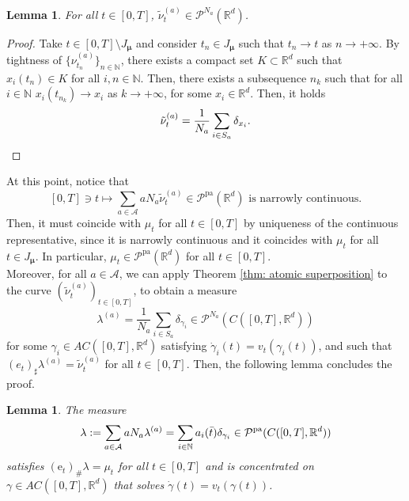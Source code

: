 \documentclass[10pt,leqno]{amsart}
\numberwithin{equation}{section}
\newtheorem{lemma}[teorema]{Lemma}
\newcommand{\R}{\mathbb{R}}
\newcommand{\N}{\mathbb{N}}
\newcommand{\PP}{\mathcal{P}}
\newcommand{\PPpa}{\PP^{\operatorname{pa}}}
\newcommand{\e}{\mathrm{e}}
\begin{document}
\begin{lemma}\label{lemma: nu_t^a}
    For all $t\in [0,T]$, $\tilde{\nu}_t^{(a)} \in \PP^{N_a}(\R^d)$. 
\end{lemma}
\begin{proof}
    Take $t\in[0,T]\setminus J_{\boldsymbol{\mu}}$ and consider $t_n \in J_{\boldsymbol{\mu}}$ such that $t_n \to t$ as $n\to +\infty$. By tightness of $\{\nu_{t_n}^{(a)}\}_{n\in \N}$, there exists a compact set $K\subset \R^d$ such that $x_i(t_n)\in K$ for all $i,n\in \N$. Then, there exists a subsequence $n_k$ such that for all $i\in \N$ $x_i(t_{n_k}) \to x_i$ as $k\to +\infty$, for some $x_i\in \R^d$. Then, it holds \[ \tilde{\nu}_t^{(a)} = \frac{1}{N_a} \sum_{i\in S_a} \delta_{x_i}. \qedhere\]
\end{proof}

At this point, notice that 
\[[0,T] \ni t \mapsto \sum_{a\in \mathcal{A}} aN_a \tilde{\nu}_t^{(a)} \in \PPpa(\R^d) \text{ is narrowly continuous}.\]
Then, it must coincide with $\mu_t$ for all $t\in [0,T]$ by uniqueness of the continuous representative, since it is narrowly continuous and it coincides with $\mu_t$ for all $t\in J_{\boldsymbol{\mu}}$. In particular, $\mu_t \in \PPpa(\R^d)$ for all $t\in [0,T]$.
\\
Moreover, for all $a\in \mathcal{A}$, we can apply Theorem \ref{thm: atomic superposition} to the curve $(\tilde{\nu}_t^{(a)})_{t\in[0,T]}$, to obtain a measure $$\lambda^{(a)} = \frac{1}{N_a} \sum_{i\in S_a} \delta_{\gamma_i} \in \PP^{N_a}(C([0,T],\R^d))$$ for some $\gamma_i \in AC([0,T],\R^d)$ satisfying $\dot\gamma_i(t) =  v_t(\gamma_i(t))$, and such that $(e_t)_\sharp \lambda^{(a)} = \tilde{\nu}_t^{(a)}$ for all $t\in[0,T]$. Then, the following lemma concludes the proof.
\begin{lemma}
    The measure
    \begin{equation}
        \lambda := \sum_{a\in \mathcal{A}} aN_a \lambda^{(a)} = \sum_{i\in \N} a_i(\Bar{t}) \delta_{\gamma_i} \in \PPpa(C([0,T],\R^d))
    \end{equation}
    satisfies $(\e_t)_\#\lambda = \mu_t$ for all $t\in [0,T]$ and is concentrated on $\gamma \in AC([0,T],\R^d)$ that solves $\dot{\gamma}(t) = v_t(\gamma(t))$. %
\end{lemma}
\end{document}
